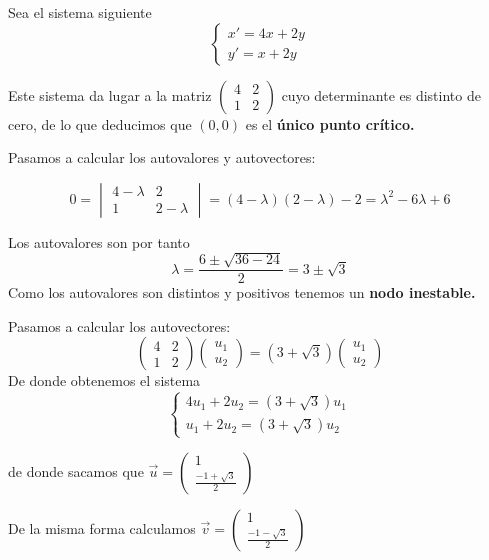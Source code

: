 \begin{example}
Sea el sistema siguiente
\begin{equation*}
\left\lbrace
\begin{array}{l}
	x' = 4x+2y\\
	y'=x+2y
\end{array}
\right.
\end{equation*}

Este sistema da lugar a la matriz $\begin{pmatrix}
4& 2\\1& 2
\end{pmatrix}$
cuyo determinante es distinto de cero, de lo que deducimos que $(0,0)$ es el \textbf{único punto crítico.}

Pasamos a calcular los autovalores y autovectores:

$$0 = \begin{vmatrix}
4-\lambda& 2\\1& 2-\lambda
\end{vmatrix} = (4-\lambda)(2-\lambda)-2 = \lambda^2-6\lambda+6$$

Los autovalores son por tanto
$$\lambda = \frac{6\pm \sqrt{36-24}}{2} = 3\pm \sqrt{3}$$
Como los autovalores son distintos y positivos tenemos un \textbf{nodo inestable.}

Pasamos a calcular los autovectores:
$$\begin{pmatrix}
4& 2\\1& 2
\end{pmatrix}\begin{pmatrix}
u_1\\ u_2
\end{pmatrix}=(3+\sqrt{3})\begin{pmatrix}
u_1\\ u_2
\end{pmatrix}$$
De donde obtenemos el sistema
\begin{equation*}
\left\lbrace
\begin{array}{l}
	4u_1+2u_2=(3+\sqrt{3})u_1\\
	u_1+2u_2 = (3+\sqrt{3})u_2
\end{array}
\right.
\end{equation*}

de donde sacamos que $\vec{u} = \begin{pmatrix}
1\\\frac{-1+\sqrt{3}}{2}
\end{pmatrix}$

De la misma forma calculamos $\vec{v} = \begin{pmatrix}
1\\\frac{-1-\sqrt{3}}{2}
\end{pmatrix}$


\end{example}
